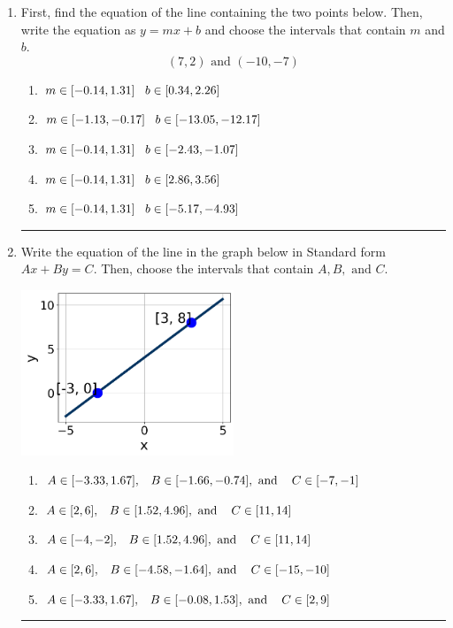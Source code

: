 \documentclass[14pt]{extbook}
\newcommand{\litem}[1]{\item#1\hspace*{-1cm}\rule{\textwidth}{0.4pt}}
\begin{document}
\begin{enumerate}
\litem{
First, find the equation of the line containing the two points below. Then, write the equation as $ y=mx+b $ and choose the intervals that contain $m$ and $b$.\[ (7, 2) \text{ and } (-10, -7) \]\begin{enumerate}[label=\Alph*.]
\item \( m \in [-0.14, 1.31] \hspace*{3mm} b \in [0.34, 2.26] \)
\item \( m \in [-1.13, -0.17] \hspace*{3mm} b \in [-13.05, -12.17] \)
\item \( m \in [-0.14, 1.31] \hspace*{3mm} b \in [-2.43, -1.07] \)
\item \( m \in [-0.14, 1.31] \hspace*{3mm} b \in [2.86, 3.56] \)
\item \( m \in [-0.14, 1.31] \hspace*{3mm} b \in [-5.17, -4.93] \)

\end{enumerate} }
\litem{
Write the equation of the line in the graph below in Standard form $Ax+By=C$. Then, choose the intervals that contain $A, B, \text{ and } C$.
\begin{center}
    \includegraphics[width=0.5\textwidth]{../Figures/linearGraphToStandardA.png}
\end{center}
\begin{enumerate}[label=\Alph*.]
\item \( A \in [-3.33, 1.67], \hspace{3mm} B \in [-1.66, -0.74], \text{ and } \hspace{3mm} C \in [-7, -1] \)
\item \( A \in [2, 6], \hspace{3mm} B \in [1.52, 4.96], \text{ and } \hspace{3mm} C \in [11, 14] \)
\item \( A \in [-4, -2], \hspace{3mm} B \in [1.52, 4.96], \text{ and } \hspace{3mm} C \in [11, 14] \)
\item \( A \in [2, 6], \hspace{3mm} B \in [-4.58, -1.64], \text{ and } \hspace{3mm} C \in [-15, -10] \)
\item \( A \in [-3.33, 1.67], \hspace{3mm} B \in [-0.08, 1.53], \text{ and } \hspace{3mm} C \in [2, 9] \)


\end{enumerate}}
\end{enumerate}
\end{document}
